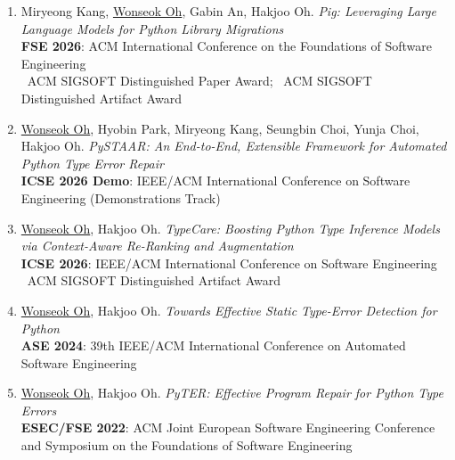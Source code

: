 \documentclass[10pt]{article} %
\begin{document}
\begin{enumerate}
    \item {
        Miryeong Kang, \underline{Wonseok Oh}, Gabin An, Hakjoo Oh. \textit{Pig: Leveraging Large Language Models for Python Library Migrations} \\
        \textbf{FSE 2026}: ACM International Conference on the Foundations of Software Engineering \\
        \awardemoji\ ACM SIGSOFT Distinguished Paper Award; \awardemoji\ ACM SIGSOFT Distinguished Artifact Award
    }
    \item {
        \underline{Wonseok Oh}, Hyobin Park, Miryeong Kang, Seungbin Choi, Yunja Choi, Hakjoo Oh. \textit{PySTAAR: An End-to-End, Extensible Framework for Automated Python Type Error Repair} \\
        \textbf{ICSE 2026 Demo}: IEEE/ACM International Conference on Software Engineering (Demonstrations Track)
    }
    \item {
        \underline{Wonseok Oh}, Hakjoo Oh. \textit{TypeCare: Boosting Python Type Inference Models via Context-Aware Re-Ranking and Augmentation} \\
        \textbf{ICSE 2026}: IEEE/ACM International Conference on Software Engineering \\
        \awardemoji\ ACM SIGSOFT Distinguished Artifact Award
    }
    \item {
        \underline{Wonseok Oh}, Hakjoo Oh. \textit{Towards Effective Static Type-Error Detection for Python} \\
        \textbf{ASE 2024}: 39th IEEE/ACM International Conference on Automated Software Engineering
    }
    \item {
        \underline{Wonseok Oh}, Hakjoo Oh. \textit{PyTER: Effective Program Repair for Python Type Errors} \\
        \textbf{ESEC/FSE 2022}: ACM Joint European Software Engineering Conference and Symposium on the Foundations of Software Engineering
    }
\end{enumerate}

\end{document}
